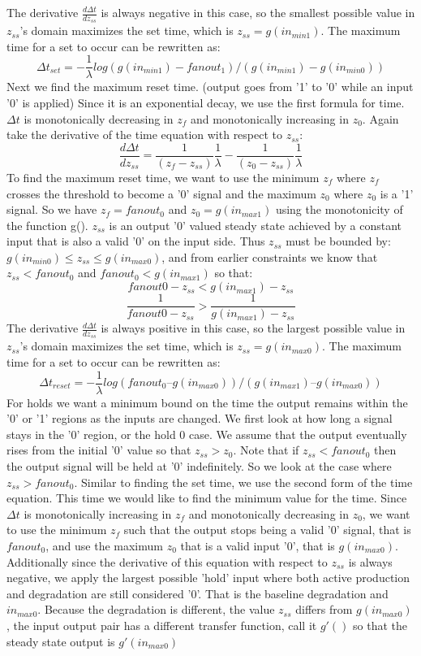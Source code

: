 \documentclass{article}
\begin{document}
The derivative $\frac{d\Delta t}{dz_{ss}}$ is always negative in this case, so the smallest possible value in $z_{ss}$'s domain maximizes the set time, which is $z_{ss}=g(in_{min1})$.
The maximum time for a set to occur can be rewritten as:
\[\Delta t_{set}= - \frac{1}{\lambda} log(g(in_{min1})-fanout_1)/(g(in_{min1}) -g(in_{min0}))
\]
Next we find the maximum reset time.  (output goes from '1' to '0' while an input '0' is applied)  Since it is an exponential decay, we use the first formula for time.  $\Delta t$ is monotonically decreasing in $z_f$ and monotonically increasing in $z_0$.  Again take the derivative of the time equation with respect to $z_{ss}$:
\[\frac{d\Delta t}{dz_{ss}}= \frac{1}{(z_f-z_{ss})}\frac{1}{\lambda}- \frac{1}{(z_0-z_{ss})}\frac{1}{\lambda}
\]
To find the maximum reset time, we want to use the minimum $z_f$ where $z_f$ crosses the threshold to become a '0' signal and the maximum $z_0$ where $z_0$ is a '1' signal.  So we have $z_f=fanout_0$ and $z_0=g(in_{max1})$ using the monotonicity of the function g().  $z_{ss}$ is an output '0' valued steady state achieved by a constant input that is also a valid '0' on the input side.  Thus $z_{ss}$ must be bounded by: $g(in_{min0})\leq z_{ss}\leq g(in_{max0})$, and from earlier constraints we know that $z_{ss}<fanout_0$ and $fanout_0<g(in_{max1})$ so that:
\[fanout0-z_{ss}< g(in_{max1})-z_{ss}
\]
\[\frac{1}{fanout0-z_{ss}}>\frac{1}{g(in_{max1})-z_{ss}}
\]
The derivative $\frac{d\Delta t}{dz_{ss}}$ is always positive in this case, so the largest possible value in $z_{ss}$'s domain maximizes the set time, which is $z_{ss}=g(in_{max0})$.
The maximum time for a set to occur can be rewritten as:
\[\Delta t_{reset}= -\frac{1}{\lambda} log(fanout_0 –g(in_{max0}))/(g(in_{max1}) – g(in_{max0}))
\]
For holds we want a minimum bound on the time the output remains within the '0' or '1' regions as the inputs are changed.  We first look at how long a signal stays in the '0' region, or the hold 0 case.  We assume that the output eventually rises from the initial '0' value so that $z_{ss}>z_0$.  Note that if $z_{ss}<fanout_0$ then the output signal will be held at '0' indefinitely.  So we look at the case where $z_{ss}>fanout_0$.  Similar to finding the set time, we use the second form of the time equation.  This time we would like to find the minimum value for the time.  Since $\Delta t$ is monotonically increasing in $z_f$ and monotonically decreasing in $z_0$, we want to use the minimum $z_f$ such that the output stops being a valid '0' signal, that is $fanout_0$, and use the maximum $z_0$ that is a valid input '0', that is $g(in_{max0})$.  Additionally since the derivative of this equation with respect to $z_{ss}$ is always negative, we apply the largest possible 'hold' input where both active production and degradation are still considered '0'.  That is the baseline degradation and $in_{max0}$.  Because the degradation is different, the value $z_{ss}$ differs from $g(in_{max0})$, the input output pair has a different transfer function, call it $g'()$ so that the steady state output is $g'(in_{max0})$
\end{document}
